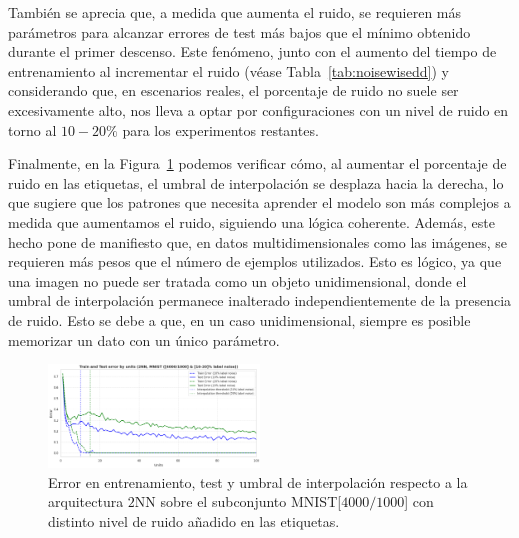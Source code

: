 También se aprecia que, a medida que aumenta el ruido, se requieren más parámetros para alcanzar errores de test más bajos que el mínimo obtenido durante el primer descenso. Este fenómeno, junto con el aumento del tiempo de entrenamiento al incrementar el ruido (véase Tabla~\ref{tab:noisewisedd}) y considerando que, en escenarios reales, el porcentaje de ruido no suele ser excesivamente alto, nos lleva a optar por configuraciones con un nivel de ruido en torno al $10-20\%$ para los experimentos restantes.\newline

Finalmente, en la Figura~\ref{fig:noise-wise-dd3} podemos verificar cómo, al aumentar el porcentaje de ruido en las etiquetas, el umbral de interpolación se desplaza hacia la derecha, lo que sugiere que los patrones que necesita aprender el modelo son más complejos a medida que aumentamos el ruido, siguiendo una lógica coherente. Además, este hecho pone de manifiesto que, en datos multidimensionales como las imágenes, se requieren más pesos que el número de ejemplos utilizados. Esto es lógico, ya que una imagen no puede ser tratada como un objeto unidimensional, donde el umbral de interpolación permanece inalterado independientemente de la presencia de ruido. Esto se debe a que, en un caso unidimensional, siempre es posible memorizar un dato con un único parámetro.\newline

\begin{figure}[h]
    \centering
    \includegraphics[width=0.5\textwidth]{img/experiments/noise-wise-dd3.png}
    \caption[Umbral de interpolación para el doble descenso con distintos niveles de ruido.]{Error en entrenamiento, test y umbral de interpolación respecto a la arquitectura $2$NN sobre el subconjunto MNIST[$4000/1000$] con distinto nivel de ruido añadido en las etiquetas.}\label{fig:noise-wise-dd3}
\end{figure}

